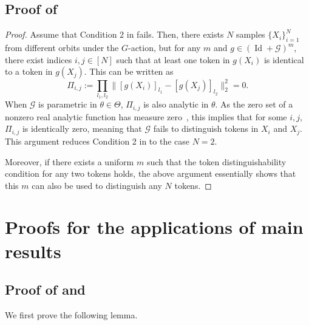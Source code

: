 \documentclass{article}
\newtheorem{lemma}{Lemma}
\newcommand{\cjp}[1]{{\footnotesize\textcolor{orange}{JC: #1}}}
\begin{document}
\subsection{Proof of }
\label{sec:analytic_proof}
\begin{proof}
Assume that Condition 2 in  fails. Then, there exists $N$ samples $\{X_i\}_{i=1}^N$ from different orbits under the $G$-action, but for any $m$ and $g\in (\operatorname{Id}+\mathcal{G})^m$, there exist indices $i,j\in [N]$ such that at least one token in $g(X_i)$ is identical to a token in $g(X_j)$. This can be written as
\begin{equation}
    \label{eq:fail_}
    \Pi_{i,j}:=\prod_{l_1,l_2} \|[g(X_i)]_{l_1}-[g(X_j)]_{l_2}\|_2^2=0.
\end{equation}
When $\mathcal{G}$ is parametric in $\theta\in\Theta$, $\Pi_{i,j}$ is also analytic in $\theta$.
As the zero set of a nonzero real analytic function has measure zero~\cite{mityagin2015zero}, this implies that for some $i,j$, $\Pi_{i,j}$ is identically zero, meaning that $\mathcal{G}$ fails to distinguish tokens in $X_i$ and $X_j$. This argument reduces Condition 2 in  to the case $N=2$.

Moreover, if there exists a uniform $m$ such that the token distinguishability condition for any two tokens holds, the above argument essentially shows that this $m$ can also be used to distinguish any $N$ tokens.
\end{proof}

\section{Proofs for the applications of main results}
\subsection{Proof of  and }
We first prove the following lemma.



\end{document}
